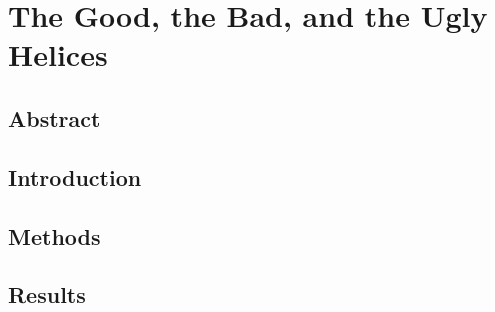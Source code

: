 
\chapter{The Good, the Bad, and the Ugly Helices} %
\section{Abstract}
\section{Introduction}
\section{Methods}
\section{Results}

